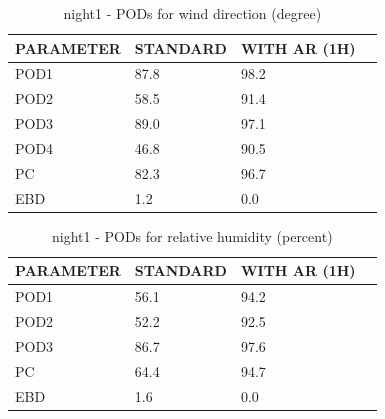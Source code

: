 \begin{table}[p!]
\begin{center}
\begin{tabular}{|l|l|l|l|}
\hline
\multicolumn{1}{|c|}{\cellcolor[HTML]{C0C0C0}\textbf{PARAMETER}} & \multicolumn{1}{c|}{\cellcolor[HTML]{C0C0C0}\textbf{STANDARD}} & \multicolumn{1}{c|}{\cellcolor[HTML]{C0C0C0}\textbf{WITH AR (1H)}} \\
\hline
\cellcolor[HTML]{C0C0C0}POD1  & 87.8      & 98.2     \\
\cellcolor[HTML]{C0C0C0}POD2  & 58.5      & 91.4     \\
\cellcolor[HTML]{C0C0C0}POD3  & 89.0      & 97.1     \\
\cellcolor[HTML]{C0C0C0}POD4  & 46.8      & 90.5     \\
\cellcolor[HTML]{C0C0C0}PC    & 82.3        & 96.7       \\
\cellcolor[HTML]{C0C0C0}EBD   & 1.2       & 0.0      \\
\hline
\end{tabular}
\caption{night1 - PODs for wind direction (degree)}
\label{tab:podwd:night1}
\end{center}
\end{table}
\begin{table}[p!]
\begin{center}
\begin{tabular}{|l|l|l|l|}
\hline
\multicolumn{1}{|c|}{\cellcolor[HTML]{C0C0C0}\textbf{PARAMETER}} & \multicolumn{1}{c|}{\cellcolor[HTML]{C0C0C0}\textbf{STANDARD}} & \multicolumn{1}{c|}{\cellcolor[HTML]{C0C0C0}\textbf{WITH AR (1H)}} \\
\hline
\cellcolor[HTML]{C0C0C0}POD1  & 56.1                                & 94.2         \\
\cellcolor[HTML]{C0C0C0}POD2  & 52.2                                & 92.5         \\
\cellcolor[HTML]{C0C0C0}POD3  & 86.7                                & 97.6         \\
\cellcolor[HTML]{C0C0C0}PC    & 64.4                                  & 94.7           \\
\cellcolor[HTML]{C0C0C0}EBD   & 1.6                                 & 0.0          \\
\hline
\end{tabular}
\caption{night1 - PODs for relative humidity (percent)}
\label{tab:podrh:night1}
\end{center}
\end{table}
